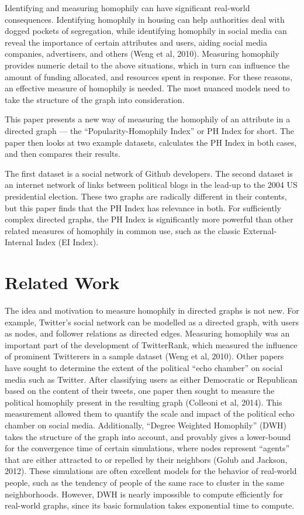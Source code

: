 \documentclass{article}
\begin{document}
Identifying and measuring homophily can have significant real-world
consequences. Identifying homophily in housing can help authorities deal
with dogged pockets of segregation, while identifying homophily in
social media can reveal the importance of certain attributes and users,
aiding social media companies, advertisers, and others (Weng et al,
2010). Measuring homophily provides numeric detail to the above
situations, which in turn can influence the amount of funding allocated,
and resources spent in response. For these reasons, an effective measure
of homophily is needed. The most nuanced models need to take the
structure of the graph into consideration.

This paper presents a new way of measuring the homophily of an attribute
in a directed graph --- the ``Popularity-Homophily Index'' or PH Index
for short. The paper then looks at two example datasets, calculates the
PH Index in both cases, and then compares their results.

The first dataset is a social network of Github developers. The second
dataset is an internet network of links between political blogs in the
lead-up to the 2004 US presidential election. These two graphs are
radically different in their contents, but this paper finds that the PH
Index has relevance in both. For sufficiently complex directed graphs,
the PH Index is significantly more powerful than other related measures
of homophily in common use, such as the classic External-Internal Index
(EI Index).

\section{Related Work}

The idea and motivation to measure homophily in directed graphs is not
new. For example, Twitter's social network can be modelled as a directed
graph, with users as nodes, and follower relations as directed edges.
Measuring homophily was an important part of the development of
TwitterRank, which measured the influence of prominent Twitterers in a
sample dataset (Weng et al, 2010). Other papers have sought to determine
the extent of the political ``echo chamber'' on social media such as
Twitter. After classifying users as either Democratic or Republican
based on the content of their tweets, one paper then sought to measure
the political homophily present in the resulting graph (Colleoni et al,
2014). This measurement allowed them to quantify the scale and impact of
the political echo chamber on social media. Additionally, ``Degree
Weighted Homophily'' (DWH) takes the structure of the graph into
account, and provably gives a lower-bound for the convergence time of
certain simulations, where nodes represent ``agents'' that are either
attracted to or repelled by their neighbors (Golub and Jackson, 2012).
These simulations are often excellent models for the behavior of
real-world people, such as the tendency of people of the same race to
cluster in the same neighborhoods. However, DWH is nearly impossible to
compute efficiently for real-world graphs, since its basic formulation
takes exponential time to compute.
\end{document}
